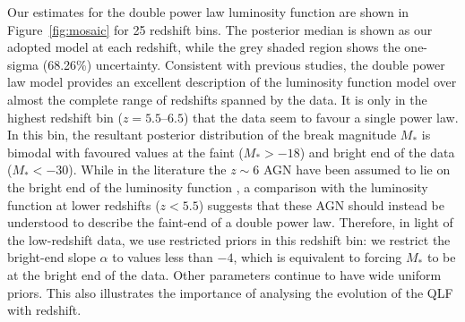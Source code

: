 \documentclass[fleqn,usenatbib]{mnras}
\begin{document}
Our estimates for the double power law luminosity function are shown
in Figure~\ref{fig:mosaic} for 25 redshift bins.
The posterior median is shown as our adopted model at each redshift,
while the grey shaded region shows the one-sigma (68.26\%)
uncertainty.  Consistent with previous studies, the double power law
model provides an excellent description of the luminosity function
model over almost the complete range of redshifts spanned by the data.
It is only in the highest redshift bin ($z=5.5$--$6.5$) that the data
seem to favour a single power law.  In this bin, the resultant
posterior distribution of the break magnitude $M_*$ is bimodal with
favoured values at the faint ($M_*>-18$) and bright end of the data
($M_*<-30$).  While in the literature the $z\sim 6$ AGN have been
assumed to lie on the bright end of the luminosity function
\citep[e.g.,][]{2016ApJ...833..222J}, a comparison with the luminosity
function at lower redshifts ($z<5.5$) suggests that these AGN should
instead be understood to describe the faint-end of a double power law.
Therefore, in light of the
low-redshift data, we use restricted priors in this
redshift bin: we
restrict the bright-end slope $\alpha$ to values less than $-4$,
which
is equivalent to forcing $M_*$ to be at the bright end of the data.
Other parameters continue to have wide uniform priors.  This also
illustrates the importance of analysing the evolution of the QLF with
redshift.
\end{document}
